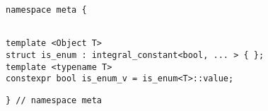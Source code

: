 
\begin{verbatim}
namespace meta {
\end{verbatim}
\begin{verbatim}

template <Object T>
struct is_enum : integral_constant<bool, ... > { };
template <typename T>
constexpr bool is_enum_v = is_enum<T>::value;

\end{verbatim}
\begin{verbatim}
} // namespace meta
\end{verbatim}
